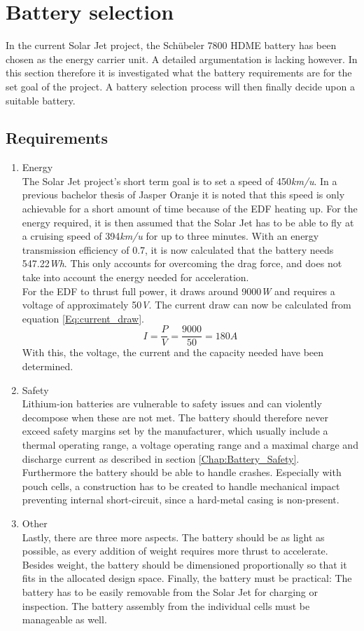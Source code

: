 \section{Battery selection}
\label{Chap:Battery_Selection}
In the current Solar Jet project, the Schübeler 7800 HDME battery has been chosen as the energy carrier unit. A detailed argumentation is lacking however. In this section therefore it is investigated what the battery requirements are for the set goal of the project. A battery selection process will then finally decide upon a suitable battery.
\subsection{Requirements}
\begin{enumerate}
\item Energy\\
The Solar Jet project's short term goal is to set a speed of 450\textit{km/u}. In a previous bachelor thesis of Jasper Oranje \cite{BEP_Jasper} it is noted that this speed is only achievable for a short amount of time because of the EDF heating up. For the energy required, it is then assumed that the Solar Jet has to be able to fly at a cruising speed of 394\textit{km/u} for up to three minutes. With an energy transmission efficiency of 0.7, it is now calculated that the battery needs 547.22\textit{Wh}. This only accounts for overcoming the drag force, and does not take into account the energy needed for acceleration.\\
For the EDF to thrust full power, it draws around 9000\textit{W} and requires a voltage of approximately 50\textit{V}. The current draw can now be calculated from equation \ref{Eq:current_draw}.
\begin{equation}
\label{Eq:current_draw}
I = \frac{P}{V} = \frac{9000}{50} = 180 \textit{A}
\end{equation}
With this, the voltage, the current and the capacity needed have been determined.
\item Safety\\
Lithium-ion batteries are vulnerable to safety issues and can violently decompose when these are not met. The battery should therefore never exceed safety margins set by the manufacturer, which usually include a thermal operating range, a voltage operating range and a maximal charge and discharge current as described in section \ref{Chap:Battery_Safety}.\\
Furthermore the battery should be able to handle crashes. Especially with pouch cells, a construction has to be created to handle mechanical impact preventing internal short-circuit, since a hard-metal casing is non-present.
\item Other\\
Lastly, there are three more aspects. The battery should be as light as possible, as every addition of weight requires more thrust to accelerate. Besides weight, the battery should be dimensioned proportionally so that it fits in the allocated design space. Finally, the battery must be practical: The battery has to be easily removable from the Solar Jet for charging or inspection. The battery assembly from the individual cells must be manageable as well.
\end{enumerate}
